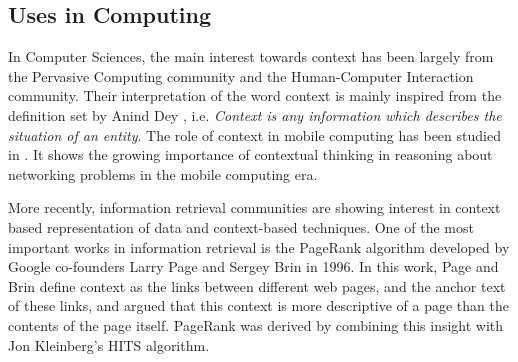 \subsection{Uses in Computing}
In Computer Sciences, the main interest towards context has been largely from the Pervasive Computing community and the Human-Computer Interaction community. Their interpretation of the word context is mainly inspired from the definition set by Anind Dey \cite{dey2001understanding}, i.e. \emph{Context is any information which describes the situation of an entity}. The role of context in mobile computing has been studied in \cite{chen2000survey}. It shows the growing importance of contextual thinking in reasoning about networking problems in the mobile computing era. 

More recently, information retrieval communities are showing interest in context based representation of data and context-based techniques. One of the most important works in information retrieval is the PageRank algorithm \cite{page1999pagerank} developed by Google co-founders Larry Page and Sergey Brin in 1996. In this work, Page and Brin define context as the links between different web pages, and the anchor text of these links, and argued that this context is more descriptive of a page than the contents of the page itself. PageRank was derived by combining this insight with Jon Kleinberg's HITS \cite{kleinberg1999authoritative} algorithm.

